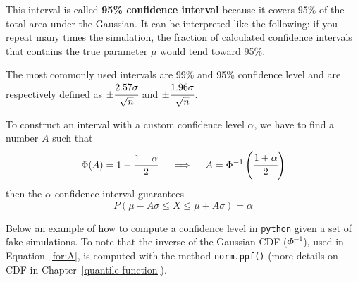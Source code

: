 This interval is called \textbf{95\% confidence interval} because
it covers 95\% of the total area under the Gaussian. It can be
interpreted like the following: if you repeat many times the simulation, 
the fraction of calculated confidence intervals that contains the true
parameter \(\mu\) would tend toward 95\%.

The most commonly used intervals are 99\% and 95\% confidence level and are
respectively defined as \(\pm \cfrac{2.57\sigma}{\sqrt{n}}\) and
\(\pm \cfrac{1.96\sigma}{\sqrt{n}}\).

To construct an interval with a custom confidence level $\alpha$, we have to find a number $A$ such that
\begin{equation}
\Phi(A) = 1 - \frac{1-\alpha}{2}\quad\implies\quad A = \Phi^{-1}\left(\cfrac{1+\alpha}{2}\right)
\label{for:A}
\end{equation}
then the $\alpha$-confidence interval guarantees
\begin{equation}
P(\mu - A\sigma \le X \le \mu+ A\sigma) = \alpha 
\end{equation}

Below an example of how to compute a confidence level in \texttt{python} given a set of fake simulations. To note that the inverse of the Gaussian CDF ($\Phi^{-1}$), used in Equation~\ref{for:A}, is computed with the method \texttt{norm.ppf()} (more details on CDF in Chapter~\ref{quantile-function}).

